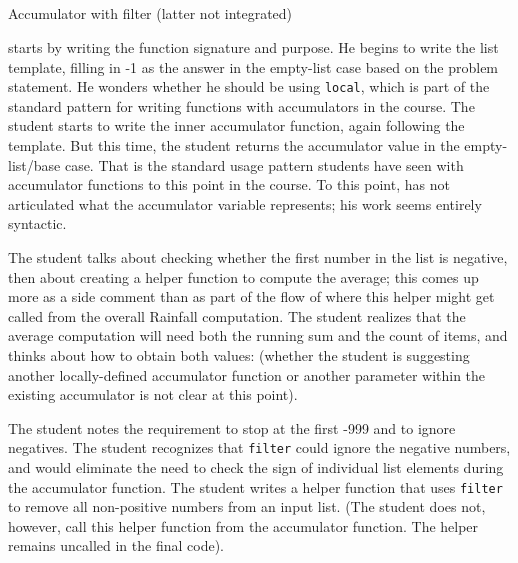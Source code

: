 \subsection{\sseven}
{Accumulator with filter (latter not integrated)}

\sseven starts by writing the function signature and purpose. He
begins to write the list template, filling in -1 as the
answer in the empty-list case based on the problem statement.  He
wonders whether he should be using \lstinline{local}, which
is part of the standard pattern for writing functions with
accumulators in the course.  The student starts to write the inner
accumulator function, again following the template.  But this time,
the student returns the accumulator value in the empty-list/base
case. That is the standard usage pattern students have seen with
accumulator functions to this point in the course.  To this point,
\sseven has not articulated what the accumulator variable represents;
his work seems entirely syntactic.

The student talks about checking whether the first number in the list
is negative, then about creating a helper function to compute
the average; this comes up more as a side comment than as part of the
flow of where this helper might get called from the overall Rainfall
computation.  The student realizes that the average computation will
need both the running sum and the count of items, and thinks about how
to obtain both values:  (whether the
student is suggesting another locally-defined accumulator function or
another parameter within the existing accumulator is not clear at this point).

The student notes the requirement to stop at the first -999 and to
ignore negatives.  The student recognizes that \lstinline{filter}
could ignore the negative numbers, and would eliminate the need to
check the sign of individual list elements during the accumulator
function.  The student writes a helper function that uses \lstinline{filter} to
remove all non-positive numbers from an input list.  (The student does
not, however, call this helper function from the accumulator function.
The helper remains uncalled in the final code).

